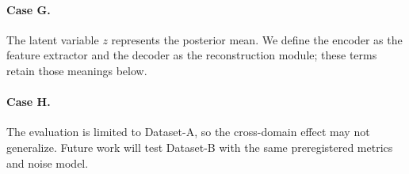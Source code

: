 \paragraph{Case G.}
The latent variable $z$ represents the posterior mean. We define the encoder as the feature
extractor and the decoder as the reconstruction module; these terms retain those meanings below.

\paragraph{Case H.}
The evaluation is limited to Dataset-A, so the cross-domain effect may not generalize. Future work
will test Dataset-B with the same preregistered metrics and noise model.
